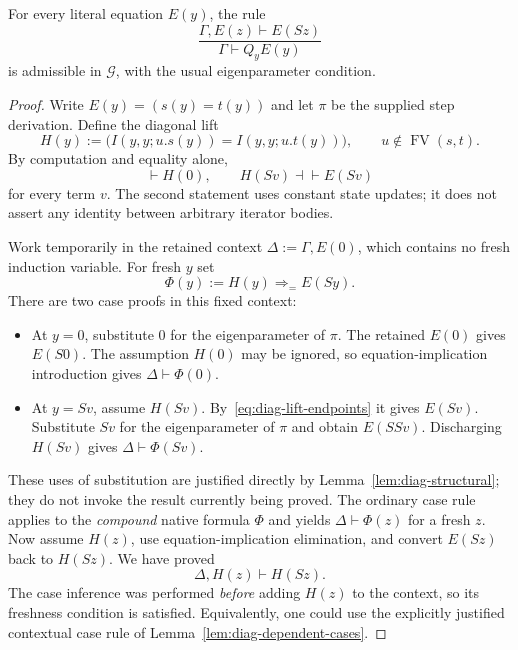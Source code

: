 \begin{theorem}
\label{thm:diag-progress}
For every literal equation $E(y)$, the rule
\[
 \frac{\Gamma,E(z)\vdash E(Sz)}{\Gamma\vdash Q_yE(y)}
\]
is admissible in $\mathcal G$, with the usual eigenparameter condition.
\end{theorem}
\begin{proof}
Write $E(y)=(s(y)=t(y))$ and let $\pi$ be the supplied step derivation.
Define the diagonal lift
\begin{equation}
 H(y):=
 \bigl(I(y,y;u.s(y))=I(y,y;u.t(y))\bigr),
 \qquad u\notin\operatorname{FV}(s,t).
 \label{eq:diag-lift}
\end{equation}
By computation and equality alone,
\begin{equation}
 \vdash H(0),\qquad
 H(Sv)\dashv\vdash E(Sv)
 \label{eq:diag-lift-endpoints}
\end{equation}
for every term $v$.  The second statement uses constant state updates;
it does not assert any identity between arbitrary iterator bodies.

Work temporarily in the retained context
$\Delta:=\Gamma,E(0)$, which contains no fresh induction variable.
For fresh $y$ set
\[
 \Phi(y):=H(y)\Rightarrow_{=}E(Sy).
\]
There are two case proofs in this fixed context:
\begin{itemize}
\item At $y=0$, substitute $0$ for the eigenparameter of $\pi$.
  The retained $E(0)$ gives $E(S0)$.
  The assumption $H(0)$ may be ignored, so equation-implication
  introduction gives $\Delta\vdash\Phi(0)$.
\item At $y=Sv$, assume $H(Sv)$.
  By~\eqref{eq:diag-lift-endpoints} it gives $E(Sv)$.
  Substitute $Sv$ for the eigenparameter of $\pi$ and obtain $E(SSv)$.
  Discharging $H(Sv)$ gives $\Delta\vdash\Phi(Sv)$.
\end{itemize}
These uses of substitution are justified directly by
Lemma~\ref{lem:diag-structural}; they do not invoke the result currently
being proved.
The ordinary case rule applies to the \emph{compound} native formula
$\Phi$ and yields $\Delta\vdash\Phi(z)$ for a fresh $z$.
Now assume $H(z)$, use equation-implication elimination, and convert
$E(Sz)$ back to $H(Sz)$.  We have proved
\[
 \Delta,H(z)\vdash H(Sz).
\]
The case inference was performed \emph{before} adding $H(z)$ to the
context, so its freshness condition is satisfied.  Equivalently, one
could use the explicitly justified contextual case rule of
Lemma~\ref{lem:diag-dependent-cases}.


\end{proof}
